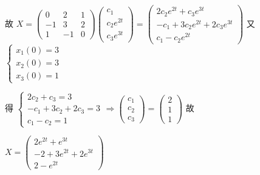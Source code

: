 \begin{enumerate}
                   故 \( X = \begin{pmatrix}
                       0  & 2  & 1 \\
                       -1 & 3  & 2 \\
                       1  & -1 & 0
                   \end{pmatrix}\begin{pmatrix}
                       c_{1}       \\
                       c_{2}e^{2t} \\
                       c_{3}e^{3t}
                   \end{pmatrix} = \begin{pmatrix}
                       2c_{2}e^{2t} + c_{3}e^{3t}           \\
                       -c_{1} + 3c_{2}e^{2t} + 2c_{3}e^{3t} \\
                       c_{1} - c_{2}e^{2t}
                   \end{pmatrix} \) 又 \( \begin{cases}
                       x_{1}(0) = 3 \\
                       x_{2}(0) = 3 \\
                       x_{3}(0) = 1
                   \end{cases} \)

                   得 \( \begin{cases}
                       2c_{2} + c_{3} = 3           \\
                       -c_{1} + 3c_{2} + 2c_{3} = 3 \\
                       c_{1} - c_{2} = 1
                   \end{cases} \Rightarrow \begin{pmatrix}
                       c_{1} \\
                       c_{2} \\
                       c_{3}
                   \end{pmatrix} = \begin{pmatrix}
                       2 \\
                       1 \\
                       1
                   \end{pmatrix} \) 故

                   \( X = \begin{pmatrix}
                       2e^{2t} + e^{3t}       \\
                       -2 + 3e^{2t} + 2e^{3t} \\
                       2 - e^{2t}
                   \end{pmatrix} \)
         \end{enumerate}


